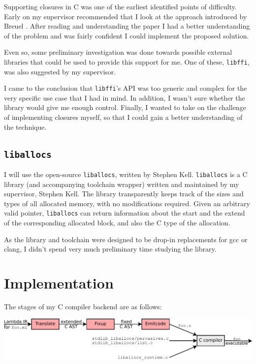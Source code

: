 \documentclass[12pt,a4paper,twoside,openright]{report}
\begin{document}
Supporting closures in C was one of the earliest identified points of difficulty.
Early on my supervisor recommended that I look at the approach introduced by
Breuel \cite{breuel88}. After reading and understanding the paper I had a
better understanding of the problem and was fairly confident I could implement
the proposed solution.

Even so, some preliminary investigation was done towards possible external
libraries that could be used to provide this support for me. One of these,
\lstinline!libffi!, was also suggested by my supervisor.

I came to the conclusion that \lstinline!libffi!'s API was too generic
and complex for the very specific use case that I had in mind. In addition, I
wasn't sure whether the library would give me enough control. Finally, I wanted
to take on the challenge of implementing closures myself, so that I could gain
a better understanding of the technique.

\section{\texttt{liballocs}}\label{liballocs}

I will use the open-source \lstinline{liballocs}, written by Stephen Kell.
\lstinline!liballocs! is a C library (and accompanying toolchain wrapper)
written and maintained by my supervisor, Stephen Kell. The library transparently
keeps track of the sizes and types of all allocated memory, with no
modifications required. Given an arbitrary valid pointer, \lstinline!liballocs!
can return information about the start and the extend of the corresponding
allocated block, and also the C type of the allocation.

As the library and toolchain were designed to be drop-in replacements for gcc or
clang, I didn't spend very much preliminary time studying the library.



\chapter{Implementation}

The stages of my C compiler backend are as follows:

\begin{center}
  \includegraphics[width=16cm]{compiler_structure}
\end{center}
\end{document}
